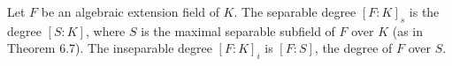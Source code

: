Let $F$ be an algebraic extension field of $K$. The separable degree $[F : K]_s$ is the degree $[S : K]$, where $S$ is the maximal separable subfield of $F$ over $K$ (as in Theorem 6.7). The inseparable degree $[F : K]_i$ is $[F : S]$, the degree of $F$ over $S$.
